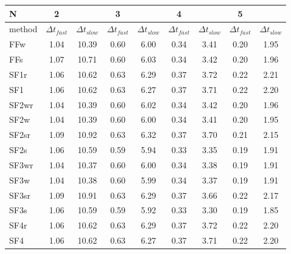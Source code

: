 \begin{tabular}{l|cc|cc|cc|cc}
N& 2  &  & 3  &  & 4  &  & 5  &  \\
\hline
method& $\Delta t_{fast}$  & $\Delta t_{slow}$& $\Delta t_{fast}$  & $\Delta t_{slow}$& $\Delta t_{fast}$  & $\Delta t_{slow}$& $\Delta t_{fast}$  & $\Delta t_{slow}$\\
\hline
FFw & 1.04 & 10.39 & 0.60 & 6.00 & 0.34 & 3.41 & 0.20 & 1.95 \\
FFs & 1.07 & 10.71 & 0.60 & 6.03 & 0.34 & 3.42 & 0.20 & 1.96 \\
SF1r & 1.06 & 10.62 & 0.63 & 6.29 & 0.37 & 3.72 & 0.22 & 2.21 \\
SF1 & 1.06 & 10.62 & 0.63 & 6.27 & 0.37 & 3.71 & 0.22 & 2.20 \\
SF2wr & 1.04 & 10.39 & 0.60 & 6.02 & 0.34 & 3.42 & 0.20 & 1.96 \\
SF2w & 1.04 & 10.39 & 0.60 & 6.00 & 0.34 & 3.41 & 0.20 & 1.95 \\
SF2sr & 1.09 & 10.92 & 0.63 & 6.32 & 0.37 & 3.70 & 0.21 & 2.15 \\
SF2s & 1.06 & 10.59 & 0.59 & 5.94 & 0.33 & 3.35 & 0.19 & 1.91 \\
SF3wr & 1.04 & 10.37 & 0.60 & 6.00 & 0.34 & 3.38 & 0.19 & 1.91 \\
SF3w & 1.04 & 10.38 & 0.60 & 5.99 & 0.34 & 3.37 & 0.19 & 1.91 \\
SF3sr & 1.09 & 10.91 & 0.63 & 6.29 & 0.37 & 3.66 & 0.22 & 2.17 \\
SF3s & 1.06 & 10.59 & 0.59 & 5.92 & 0.33 & 3.30 & 0.19 & 1.85 \\
SF4r & 1.06 & 10.62 & 0.63 & 6.29 & 0.37 & 3.72 & 0.22 & 2.20 \\
SF4 & 1.06 & 10.62 & 0.63 & 6.27 & 0.37 & 3.71 & 0.22 & 2.20 \\
\hline
\end{tabular}
